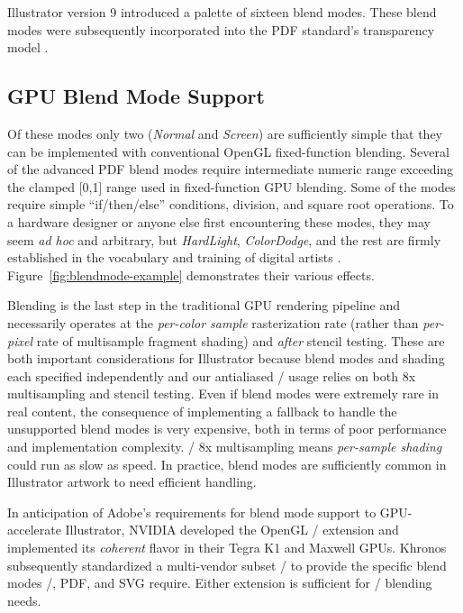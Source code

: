 Illustrator version 9 introduced a palette of sixteen blend modes.
These blend modes were subsequently incorporated into
the PDF standard's transparency model \cite{TransparencyInPDF}.

\subsection{GPU Blend Mode Support}

Of these modes
only two ({\em Normal} and {\em Screen}) are sufficiently simple that
they can be implemented with conventional OpenGL fixed-function blending.
Several of the advanced PDF
blend modes require intermediate numeric range exceeding the clamped [0,1] range
used in fixed-function GPU blending.
Some of the modes require simple ``if/then/else'' conditions, division, and square root operations.
To a hardware designer or anyone else first encountering these modes, they may seem {\em ad hoc} and  arbitrary,
but {\em HardLight}, {\em ColorDodge}, and the rest are firmly established in the vocabulary and training of digital artists \cite{HiddenPowerOfBlendModes}.  Figure~\ref{fig:blendmode-example} demonstrates their various effects.

\ifdefined\NOSHOW
Blending is the last step in the traditional GPU rendering pipeline and necessarily operates
at the {\em per-color sample} rasterization rate
(rather than {\em per-pixel} rate of multisample fragment shading)
and {\em after} stencil testing.
These are both important considerations
for Illustrator because blend modes and shading each specified independently and our
antialiased \NVpr/ usage relies on both 8x multisampling and stencil testing.
Even if blend modes
were extremely rare in real content,
the consequence of implementing a fallback to handle
the unsupported blend modes is very expensive, both in terms of poor performance and implementation
complexity.  \Illustrators/ 8x multisampling means {\em per-sample shading}
could run as slow as 
speed.
In practice, blend modes are sufficiently common in Illustrator artwork
to need efficient handling.
\fi

\ifdefined\NOSHOW
In anticipation of Adobe's requirements for blend mode support to GPU-accelerate
Illustrator,
NVIDIA developed the OpenGL \NVbea/ extension \cite{NVbeaSpec}
and implemented its {\em coherent} flavor in their Tegra K1 and Maxwell GPUs.
Khronos subsequently standardized a multi-vendor subset \KHRbea/ \cite{KHRbeaSpec} to provide
the specific blend modes \Illustrator/, PDF, and SVG \cite{SVG-Compositing-Spec} require.
Either extension is sufficient for \Illustrators/ blending needs.

